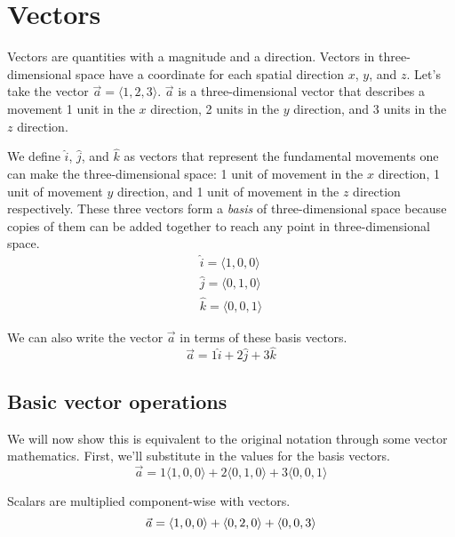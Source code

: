 \section{Vectors}

Vectors are quantities with a magnitude and a direction. Vectors in
three-dimensional space have a coordinate for each spatial direction $x$, $y$,
and $z$. Let's take the vector $\vec{a} = \langle 1, 2, 3 \rangle$. $\vec{a}$ is
a three-dimensional vector that describes a movement 1 unit in the $x$
direction, 2 units in the $y$ direction, and 3 units in the $z$ direction.

We define $\hat{i}$, $\hat{j}$, and $\hat{k}$ as vectors that represent the
fundamental movements one can make the three-dimensional space: 1 unit of
movement in the $x$ direction, 1 unit of movement $y$ direction, and 1 unit of
movement in the $z$ direction respectively. These three vectors form a
\textit{basis} of three-dimensional space because copies of them can be added
together to reach any point in three-dimensional space.
\begin{align*}
  \hat{i} = \langle 1, 0, 0 \rangle \\
  \hat{j} = \langle 0, 1, 0 \rangle \\
  \hat{k} = \langle 0, 0, 1 \rangle
\end{align*}

We can also write the vector $\vec{a}$ in terms of these basis vectors.
\begin{equation*}
  \vec{a} = 1\hat{i} + 2\hat{j} + 3\hat{k}
\end{equation*}

\subsection{Basic vector operations}

We will now show this is equivalent to the original notation through some vector
mathematics. First, we'll substitute in the values for the basis vectors.
\begin{equation*}
  \vec{a} = 1\langle 1, 0, 0 \rangle + 2\langle 0, 1, 0 \rangle +
    3\langle 0, 0, 1 \rangle
\end{equation*}

Scalars are multiplied component-wise with vectors.
\begin{equation*}
  \vec{a} = \langle 1, 0, 0 \rangle + \langle 0, 2, 0 \rangle +
    \langle 0, 0, 3 \rangle \\
\end{equation*}

